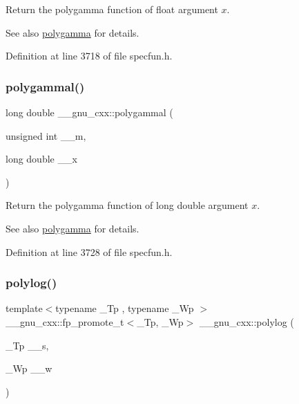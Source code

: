 Return the polygamma function of {\ttfamily float} argument $ x $.

\begin{DoxySeeAlso}{See also}
\hyperlink{group__gnu__math__spec__func_ga65e674e7fe1457e819897e0d608c18b8}{polygamma} for details. 
\end{DoxySeeAlso}


Definition at line 3718 of file specfun.\+h.

\mbox{\label{group__gnu__math__spec__func_gaa6a37359a97ba43f32aa842705c416d4}} 
\subsubsection{\texorpdfstring{polygammal()}{polygammal()}}
{\footnotesize\ttfamily long double \+\_\+\+\_\+gnu\+\_\+cxx\+::polygammal (\begin{DoxyParamCaption}\item[{unsigned int}]{\+\_\+\+\_\+m,  }\item[{long double}]{\+\_\+\+\_\+x }\end{DoxyParamCaption})\hspace{0.3cm}{\ttfamily [inline]}}

Return the polygamma function of {\ttfamily long double} argument $ x $.

\begin{DoxySeeAlso}{See also}
\hyperlink{group__gnu__math__spec__func_ga65e674e7fe1457e819897e0d608c18b8}{polygamma} for details. 
\end{DoxySeeAlso}


Definition at line 3728 of file specfun.\+h.

\mbox{\label{group__gnu__math__spec__func_gabcc5480ad739561c2debd6a8a352084f}} 
\subsubsection{\texorpdfstring{polylog()}{polylog()}\hspace{0.1cm}{\footnotesize\ttfamily [1/2]}}
{\footnotesize\ttfamily template$<$typename \+\_\+\+Tp , typename \+\_\+\+Wp $>$ \\
\+\_\+\+\_\+gnu\+\_\+cxx\+::fp\+\_\+promote\+\_\+t$<$\+\_\+\+Tp, \+\_\+\+Wp$>$ \+\_\+\+\_\+gnu\+\_\+cxx\+::polylog (\begin{DoxyParamCaption}\item[{\+\_\+\+Tp}]{\+\_\+\+\_\+s,  }\item[{\+\_\+\+Wp}]{\+\_\+\+\_\+w }\end{DoxyParamCaption})\hspace{0.3cm}{\ttfamily [inline]}}

